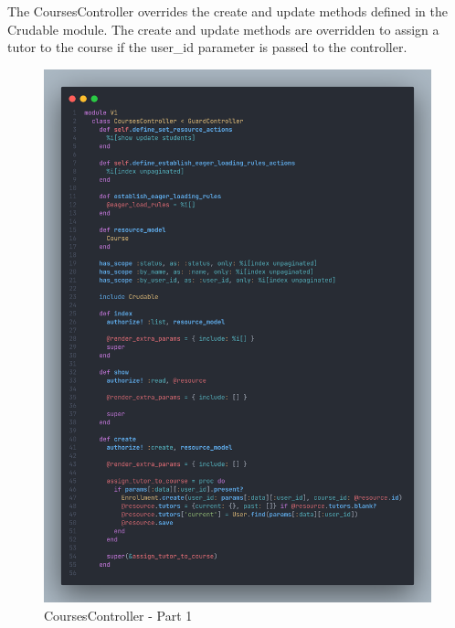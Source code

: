 \begin{justify}
    
    \vspace{0.25cm}
    \newendline The CoursesController overrides the create and update methods defined in the Crudable module. The create and update methods are overridden to assign a tutor to the course if the user\_id parameter is passed to the controller.\\

    \begin{figure}[H]
        \centerline{\includegraphics[width=150mm,scale=1]{figures/implementation_and_testing/implementation/backend/courses_controller-1.png}}
        \caption{CoursesController - Part 1}
    \end{figure}


\end{justify}
